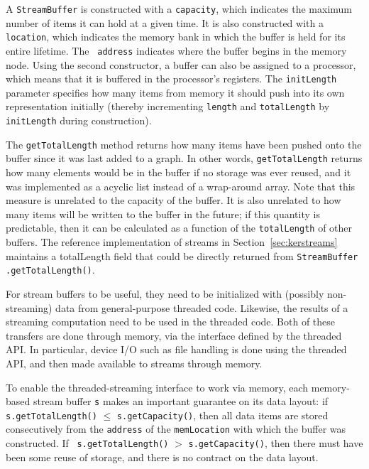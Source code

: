A {\tt StreamBuffer} is constructed with a {\tt capacity}, which
indicates the maximum number of items it can hold at a given time.  It
is also constructed with a {\tt location}, which indicates the memory
bank in which the buffer is held for its entire lifetime.  The {\tt
address} indicates where the buffer begins in the memory node.  Using
the second constructor, a buffer can also be assigned to a processor,
which means that it is buffered in the processor's registers.  The
{\tt initLength} parameter specifies how many items from memory it
should push into its own representation initially (thereby
incrementing {\tt length} and {\tt totalLength} by {\tt initLength}
during construction).

The {\tt getTotalLength} method returns how many items have been
pushed onto the buffer since it was last added to a graph.  In other
words, {\tt getTotalLength} returns how many elements would be in the
buffer if no storage was ever reused, and it was implemented as a
acyclic list instead of a wrap-around array.  Note that this measure
is unrelated to the capacity of the buffer.  It is also unrelated to
how many items will be written to the buffer in the future; if this
quantity is predictable, then it can be calculated as a function of
the {\tt totalLength} of other buffers.  The reference implementation
of streams in Section~\ref{sec:kerstreams} maintains a totalLength
field that could be directly returned from {\tt StreamBuffer}{\tt
.}{\tt getTotalLength()}.

\label{sec:movestream}

For stream buffers to be useful, they need to be initialized with
(possibly non-streaming) data from general-purpose threaded code.
Likewise, the results of a streaming computation need to be used in
the threaded code.  Both of these transfers are done through memory,
via the interface defined by the threaded API.  In particular, device
I/O such as file handling is done using the threaded API, and then
made available to streams through memory.

To enable the threaded-streaming interface to work via memory, each
memory-based stream buffer {\tt s} makes an important guarantee on its
data layout: if {\tt s.getTotalLength()} $\le$ {\tt s.getCapacity()},
then all data items are stored consecutively from the {\tt address} of
the {\tt memLocation} with which the buffer was constructed.  If {\tt
s.getTotalLength()} $>$ {\tt s.getCapacity()}, then there must have
been some reuse of storage, and there is no contract on the data
layout.

